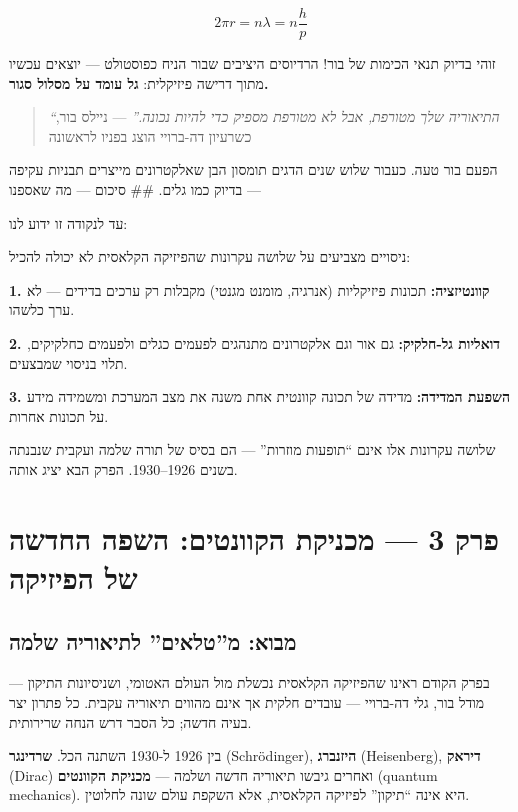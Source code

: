 \documentclass[
  hebrew,
  letterpaper,
  DIV=11,
  numbers=noendperiod]{scrreprt}
\begin{document}
\[2\pi r = n\lambda = n\frac{h}{p}\]

זוהי בדיוק תנאי הכימות של בור! הרדיוסים היציבים שבור הניח כפוסטולט ---
יוצאים עכשיו מתוך דרישה פיזיקלית: \textbf{גל עומד על מסלול סגור.}

\begin{quote}
\emph{``התיאוריה שלך מטורפת, אבל לא מטורפת מספיק כדי להיות נכונה.''} ---
ניילס בור, כשרעיון דה-ברויי הוצג בפניו לראשונה
\end{quote}

הפעם בור טעה. כעבור שלוש שנים הדגים תומסון הבן שאלקטרונים מייצרים תבניות
עקיפה --- בדיוק כמו גלים. \#\# סיכום --- מה שאספנו

עד לנקודה זו ידוע לנו:

ניסויים מצביעים על שלושה עקרונות שהפיזיקה הקלאסית לא יכולה להכיל:

\textbf{1. קוונטיזציה:} תכונות פיזיקליות (אנרגיה, מומנט מגנטי) מקבלות רק
ערכים בדידים --- לא ערך כלשהו.

\textbf{2. דואליות גל-חלקיק:} גם אור וגם אלקטרונים מתנהגים לפעמים כגלים
ולפעמים כחלקיקים, תלוי בניסוי שמבצעים.

\textbf{3. השפעת המדידה:} מדידה של תכונה קוונטית אחת משנה את מצב המערכת
ומשמידה מידע על תכונות אחרות.

שלושה עקרונות אלו אינם ``תופעות מוזרות'' --- הם בסיס של תורה שלמה ועקבית
שנבנתה בשנים 1926--1930. הפרק הבא יציג אותה.


\chapter{פרק 3 --- מכניקת הקוונטים: השפה החדשה של
הפיזיקה}\label{ux5e4ux5e8ux5e7-3-ux5deux5dbux5e0ux5d9ux5e7ux5ea-ux5d4ux5e7ux5d5ux5d5ux5e0ux5d8ux5d9ux5dd-ux5d4ux5e9ux5e4ux5d4-ux5d4ux5d7ux5d3ux5e9ux5d4-ux5e9ux5dc-ux5d4ux5e4ux5d9ux5d6ux5d9ux5e7ux5d4}

\section{מבוא: מ''טלאים'' לתיאוריה
שלמה}\label{ux5deux5d1ux5d5ux5d0-ux5deux5d8ux5dcux5d0ux5d9ux5dd-ux5dcux5eaux5d9ux5d0ux5d5ux5e8ux5d9ux5d4-ux5e9ux5dcux5deux5d4}

בפרק הקודם ראינו שהפיזיקה הקלאסית נכשלת מול העולם האטומי, ושניסיונות
התיקון --- מודל בור, גלי דה-ברויי --- עובדים חלקית אך אינם מהווים
תיאוריה עקבית. כל פתרון יצר בעיה חדשה; כל הסבר דרש הנחה שרירותית.

בין 1926 ל-1930 השתנה הכל. \textbf{שרדינגר} (Schrödinger),
\textbf{היזנברג} (Heisenberg), \textbf{דיראק} (Dirac) ואחרים גיבשו
תיאוריה חדשה ושלמה --- \textbf{מכניקת הקוונטים} (quantum mechanics). היא
אינה ``תיקון'' לפיזיקה הקלאסית, אלא השקפת עולם שונה לחלוטין.
\end{document}
